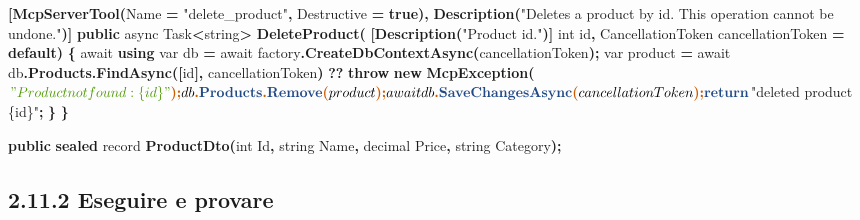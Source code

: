 \documentclass[
  italian,
  10pt,
]{book}
\newenvironment{Shaded}{\begin{snugshade}}{\end{snugshade}}
\newcommand{\DataTypeTok}[1]{\textcolor[rgb]{0.13,0.29,0.53}{#1}}
\newcommand{\FunctionTok}[1]{\textcolor[rgb]{0.13,0.29,0.53}{\textbf{#1}}}
\newcommand{\KeywordTok}[1]{\textcolor[rgb]{0.13,0.29,0.53}{\textbf{#1}}}
\newcommand{\NormalTok}[1]{#1}
\newcommand{\OperatorTok}[1]{\textcolor[rgb]{0.81,0.36,0.00}{\textbf{#1}}}
\newcommand{\StringTok}[1]{\textcolor[rgb]{0.31,0.60,0.02}{#1}}
\begin{document}
\begin{Shaded}
\begin{Highlighting}[]
    \OperatorTok{[}\FunctionTok{McpServerTool}\OperatorTok{(}\NormalTok{Name }\OperatorTok{=} \StringTok{"delete\_product"}\OperatorTok{,}\NormalTok{ Destructive }\OperatorTok{=} \KeywordTok{true}\OperatorTok{),}
     \FunctionTok{Description}\OperatorTok{(}\StringTok{"Deletes a product by id. This operation cannot be undone."}\OperatorTok{)]}
    \KeywordTok{public}\NormalTok{ async Task}\OperatorTok{\textless{}}\DataTypeTok{string}\OperatorTok{\textgreater{}} \FunctionTok{DeleteProduct}\OperatorTok{(}
        \OperatorTok{[}\FunctionTok{Description}\OperatorTok{(}\StringTok{"Product id."}\OperatorTok{)]} \DataTypeTok{int}\NormalTok{ id}\OperatorTok{,}
\NormalTok{        CancellationToken cancellationToken }\OperatorTok{=} \KeywordTok{default}\OperatorTok{)}
    \OperatorTok{\{}
\NormalTok{        await }\KeywordTok{using} \DataTypeTok{var}\NormalTok{ db }\OperatorTok{=}\NormalTok{ await factory}\OperatorTok{.}\FunctionTok{CreateDbContextAsync}\OperatorTok{(}\NormalTok{cancellationToken}\OperatorTok{);}
        \DataTypeTok{var}\NormalTok{ product }\OperatorTok{=}\NormalTok{ await db}\OperatorTok{.}\FunctionTok{Products}\OperatorTok{.}\FunctionTok{FindAsync}\OperatorTok{([}\NormalTok{id}\OperatorTok{],}\NormalTok{ cancellationToken}\OperatorTok{)}
            \OperatorTok{??} \KeywordTok{throw} \KeywordTok{new} \FunctionTok{McpException}\OperatorTok{(}\NormalTok{$}\StringTok{"Product not found: \{id\}"}\OperatorTok{);}
\NormalTok{        db}\OperatorTok{.}\FunctionTok{Products}\OperatorTok{.}\FunctionTok{Remove}\OperatorTok{(}\NormalTok{product}\OperatorTok{);}
\NormalTok{        await db}\OperatorTok{.}\FunctionTok{SaveChangesAsync}\OperatorTok{(}\NormalTok{cancellationToken}\OperatorTok{);}
        \KeywordTok{return}\NormalTok{ $}\StringTok{"deleted product \{id\}"}\OperatorTok{;}
    \OperatorTok{\}}
\OperatorTok{\}}

\KeywordTok{public} \KeywordTok{sealed}\NormalTok{ record }\FunctionTok{ProductDto}\OperatorTok{(}\DataTypeTok{int}\NormalTok{ Id}\OperatorTok{,} \DataTypeTok{string}\NormalTok{ Name}\OperatorTok{,} \DataTypeTok{decimal}\NormalTok{ Price}\OperatorTok{,} \DataTypeTok{string}\NormalTok{ Category}\OperatorTok{);}
\end{Highlighting}
\end{Shaded}

\subsection{2.11.2 Eseguire e provare}\label{eseguire-e-provare}
\end{document}
